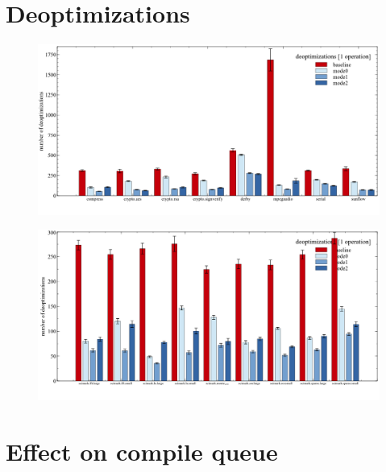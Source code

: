 \section{Deoptimizations}
\label{s:perf_deoptimizations}

\begin{figure}[ht]
  \begin{center}
    \centering
    \includegraphics[width=1.0\textwidth]{figures/others_warmup_deopt.png}
    \caption{}
    \label{f:others_warmup_deopt}
  \end{center}
\end{figure}

\begin{figure}[ht]
  \begin{center}
    \centering
    \includegraphics[width=1.0\textwidth]{figures/scimark_warmup_deopt.png}
    \caption{}
    \label{f:scimark_warmup_deopt}
  \end{center}
\end{figure}



\section{Effect on compile queue}
\label{s:perf_compilequeue}
